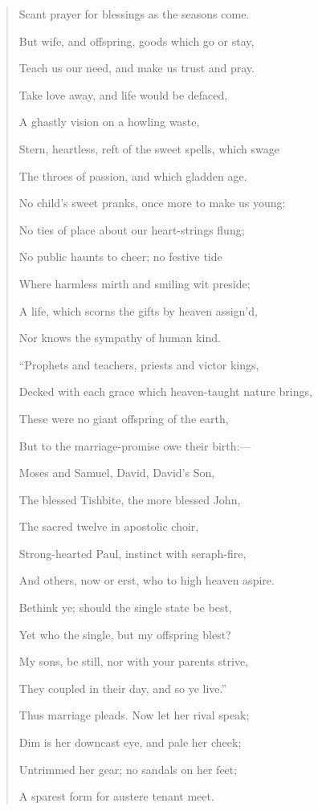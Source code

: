 \begin{quote}
Scant prayer for blessings as the seasons come.

But wife, and offspring, goods which go or
stay,

Teach us our need, and make us trust and
pray.

Take love away, and life would be defaced,

A ghastly vision on a howling waste,

Stern, heartless, reft of the sweet spells,
which swage

The throes of passion, and which gladden age.

No child's sweet pranks, once more to make us
young;

No ties of place about our heart-strings
flung;

No public haunts to cheer; no festive tide

Where harmless mirth and smiling wit preside;

A life, which scorns the gifts by heaven assign'd,

Nor knows the sympathy of human kind.

``Prophets and teachers, priests and
victor kings,

Decked with each grace which heaven-taught nature brings,

These were no giant offspring of the earth,

But to the marriage-promise owe their birth:—

Moses and Samuel, David, David's Son,

The blessed Tishbite, the more blessed John,

The sacred twelve in apostolic choir,

Strong-hearted Paul, instinct with seraph-fire,

And others, now or erst, who to high heaven aspire.

Bethink ye; should the single state be best,

Yet who the single, but my offspring blest?

My sons, be still, nor with your parents strive,

They coupled in their day, and so ye live.''

Thus marriage pleads. Now let her rival speak;

Dim is her downcast eye, and pale her cheek;

Untrimmed her gear; no sandals on her feet;

A sparest form for austere tenant meet.


\end{quote}
